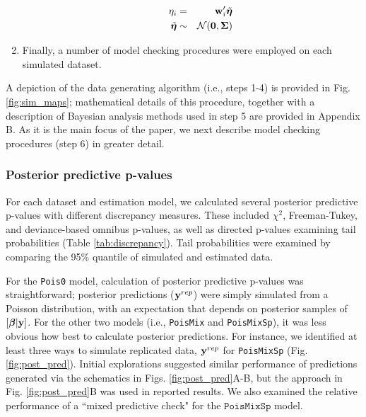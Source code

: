 \documentclass[12pt,english]{article}
\begin{document}
\begin{spacing}{1.9}
\begin{enumerate}
\begin{itemize}
\begin{eqnarray*}
      \eta_i & = & {\bf w}_i^\prime \tilde{\boldsymbol{\eta}} \\
      \tilde{\boldsymbol{\eta}} & \sim & \mathcal{N}(\textbf{0},\boldsymbol{\Sigma}) \\
    \end{eqnarray*}
  \end{itemize}
\item Finally, a number of model checking procedures were employed on
  each simulated dataset.
\end{enumerate}
A depiction of the data generating algorithm (i.e., steps 1-4) is
provided in Fig. \ref{fig:sim_maps}; mathematical details of this
procedure, together with a description of Bayesian analysis methods
used in step 5 are provided in Appendix B.  As it is the main focus of
the paper, we next describe model checking procedures (step 6) in
greater detail.

\subsubsection{Posterior predictive p-values}

For each dataset and estimation model, we calculated several posterior predictive
p-values with different discrepancy measures.  These included
$\chi^2$, Freeman-Tukey, and deviance-based omnibus p-values, as well
as directed p-values examining tail probabilities (Table
\ref{tab:discrepancy}). Tail probabilities were examined by comparing
the 95\% quantile of simulated and estimated data.

For the \texttt{Pois0} model, calculation of posterior predictive
p-values was straightforward; posterior predictions (${\bf y}^{rep}$)
were simply simulated from a Poisson distribution, with an expectation
that depends on posterior samples of $[\boldsymbol{\beta}|{\bf y}]$.  For the other
two models (i.e., \texttt{PoisMix} and \texttt{PoisMixSp}), it was
less obvious how best to calculate posterior predictions.  For
instance, we identified at least three ways to simulate replicated
data, ${\bf y}^{rep}$ for \texttt{PoisMixSp} (Fig. \ref{fig:post_pred}).
Initial explorations suggested similar performance of predictions
generated via the schematics in Figs. \ref{fig:post_pred}A-B, but the
approach in Fig. \ref{fig:post_pred}B was used in reported results.
We also examined the relative performance of a ``mixed predictive
check" \citep[][;
Fig. \ref{fig:post_pred}C]{MarshallSpiegelhalter2007} for the
$\texttt{PoisMixSp}$ model.


\end{spacing}
\end{document}
